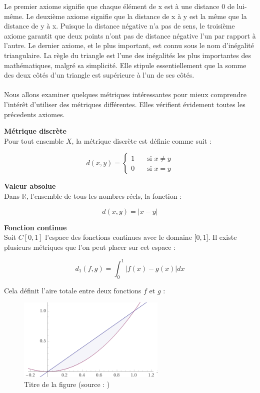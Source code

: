Le premier axiome signifie que chaque élément de x est à une distance 0 de lui-même. Le deuxième axiome signifie que la distance de x à y est la même que la distance de y à x. Puisque la distance négative n'a pas de sens, le troisième axiome garantit que deux points n'ont pas de distance négative l'un par rapport à l'autre. Le dernier axiome, et le plus important, est connu sous le nom d'inégalité triangulaire. La règle du triangle est l'une des inégalités les plus importantes des mathématiques, malgré sa simplicité. Elle stipule essentiellement que la somme des deux côtés d'un triangle est supérieure à l'un de ses côtés.
\\
\\
Nous allons examiner quelques métriques intéressantes pour mieux comprendre l'intérêt d'utiliser des métriques différentes. Elles vérifient évidement toutes les précedents axiomes.


\textbf{Métrique discrète}
\\
Pour tout ensemble $X$, la métrique discrète est définie comme suit :

\[ d(x,y) =
  \begin{cases}
    1       & \quad \text{si } x \ne y \\
    0       & \quad \text{si } x = y 
  \end{cases}
\]



\textbf{Valeur absolue}
\\
Dans $\mathbb{R}$, l'ensemble de tous les nombres réels, la fonction : 

$$ d(x,y) = \lvert x - y \rvert$$

\textbf{Fonction continue}
\\
Soit $C[0, 1]$ l'espace des fonctions continues avec le domaine [$0, 1]$. Il existe plusieurs métriques que l'on peut placer sur cet espace :

$$ d_1(f,g) = \int_0^1  \lvert f(x) - g(x) \rvert dx$$


Cela définit l'aire totale entre deux fonctions $f$ et $g$ : 


\begin{figure}[h!]
  \caption{Titre de la figure (source : \cite{arrow48})}
  \includegraphics[width=200pt]{./img/notions_math/metric/courbe_metric_fcn}
\end{figure}

